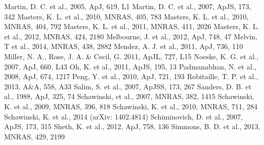 \documentclass{mn2e}
\begin{document}
\begin{thebibliography}{}
 Martin, D. C. et al., 2005, ApJ, 619, L1
 Martin, D. C. et al., 2007, ApJS, 173, 342
 Masters, K. L. et al., 2010, MNRAS, 405, 783
 Masters, K. L. et al., 2010, MNRAS, 404, 792
 Masters, K. L. et al., 2011, MNRAS, 411, 2026
 Masters, K. L. et al., 2012, MNRAS, 424, 2180
 Melbourne, J. et al., 2012, ApJ, 748, 47
 Melvin, T et al., 2014, MNRAS, 438, 2882
 Mendez, A. J. et al., 2011, ApJ, 736, 110
 Miller, N. A., Rose, J. A. \& Cecil, G. 2011, ApJL, 727, L15
 Noeske, K. G. et al., 2007, ApJ, 660, L43
 Oh, K. et al., 2011, ApJS, 195, 13
 Padmanabhan, N. et al., 2008, ApJ, 674, 1217
 Peng, Y. et al., 2010, ApJ, 721, 193
 Robitaille, T. P. et al., 2013, A\&A, 558, A33
 Salim, S. et al., 2007, ApJSS, 173, 267
 Sanders, D. B. et al., 1988, ApJ, 325, 74
 Schawinski, et al., 2007, MNRAS, 382, 1415
 Schawinski, K. et al., 2009, MNRAS, 396, 818
 Schawinski, K. et al., 2010, MNRAS, 711, 284
 Schawinski, K. et al., 2014 (arXiv: 1402.4814)
 Schiminovich, D. et al., 2007, ApJS, 173, 315
 Sheth, K. et al., 2012, ApJ, 758, 136
 Simmons, B. D. et al., 2013, MNRAS, 429, 2199

\end{thebibliography}
\end{document}
